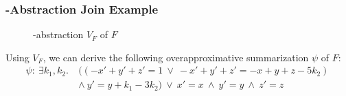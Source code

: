
\begin{frame}[t]
	\frametitle{\qvasr-Abstraction Join Example}
	\begin{center}
		\begin{figure}
			
			\caption*{\qvasr-abstraction $V_F$ of $F$}
		\end{figure}
	\end{center}
	\pause
	\begin{center}
	Using $V_F$, we can derive the following overapproximative summarization $\psi$ of $F$:
	\begin{align*}
	 \psi: \	\exists k_1, k_2.\ &((-x' + y' + z' = 1\ \lor\ -x' + y' + z' = -x + y + z - 5k_2)\ \\ &\land\ y' = y + k_1 - 3k_2)\ \lor\ x' = x\ \land\ y' = y\ \land\ z' = z
	\end{align*}
	\end{center}
\end{frame}
